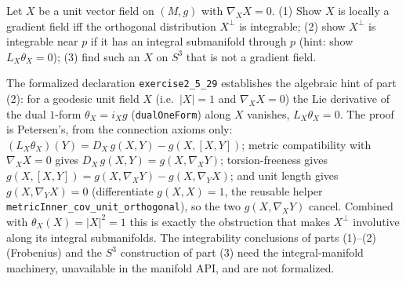 \begin{remark}
  \label{rem:pet-ch2-ex-29}
  \leanok
  Let $X$ be a unit vector field on $(M,g)$ with $\nabla_XX=0$. (1) Show $X$
  is locally a gradient field iff the orthogonal distribution $X^\perp$ is
  integrable; (2) show $X^\perp$ is integrable near $p$ if it has an integral
  submanifold through $p$ (hint: show $L_X\theta_X=0$); (3) find such an $X$
  on $S^3$ that is not a gradient field.

  The formalized declaration \texttt{exercise2\_5\_29} establishes the algebraic
  hint of part (2): for a geodesic unit field $X$ (i.e.\ $|X|=1$ and
  $\nabla_XX=0$) the Lie derivative of the dual $1$-form $\theta_X=i_Xg$
  (\texttt{dualOneForm}) along $X$ vanishes, $L_X\theta_X=0$. The proof is
  Petersen's, from the connection axioms only:
  $(L_X\theta_X)(Y)=D_X\,g(X,Y)-g(X,[X,Y])$; metric compatibility with
  $\nabla_XX=0$ gives $D_X\,g(X,Y)=g(X,\nabla_XY)$; torsion-freeness gives
  $g(X,[X,Y])=g(X,\nabla_XY)-g(X,\nabla_YX)$; and unit length gives
  $g(X,\nabla_YX)=0$ (differentiate $g(X,X)=1$, the reusable helper
  \texttt{metricInner\_cov\_unit\_orthogonal}), so the two $g(X,\nabla_XY)$
  cancel. Combined with $\theta_X(X)=|X|^2=1$ this is exactly the obstruction
  that makes $X^\perp$ involutive along its integral submanifolds. The
  integrability conclusions of parts (1)--(2) (Frobenius) and the $S^3$
  construction of part (3) need the integral-manifold machinery, unavailable in
  the manifold API, and are not formalized.
\end{remark}

